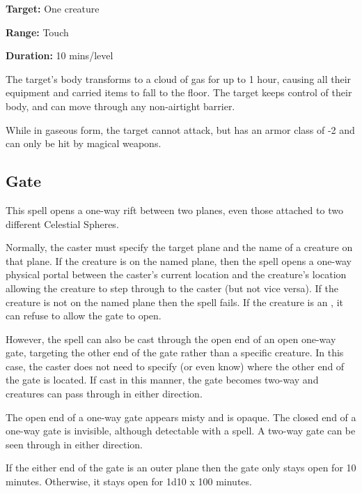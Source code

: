 \begin{multicols*}{2}
{\textbf{Target:} One creature

\textbf{Range:} Touch

\textbf{Duration:} 10 mins/level}

The target’s body transforms to a cloud of gas for up to 1 hour, causing all their equipment and carried items to fall to the floor. The target keeps control of their body, and can move through any non-airtight barrier.

While in gaseous form, the target cannot attack, but has an armor class of -2 and can only be hit by magical weapons.

\subsection{Gate}\label{spell:Gate}

This spell opens a one-way rift between two planes, even those attached to two different Celestial Spheres.

Normally, the caster must specify the target plane and the name of a creature on that plane. If the creature is on the named plane, then the spell opens a one-way physical portal between the caster’s current location and the creature’s location allowing the creature to step through to the caster (but not vice versa). If the creature is not on the named plane then the spell fails. If the creature is an , it can refuse to allow the gate to open.

However, the spell can also be cast through the open end of an open one-way gate, targeting the other end of the gate rather than a specific creature. In this case, the caster does not need to specify (or even know) where the other end of the gate is located. If cast in this manner, the gate becomes two-way and creatures can pass through in either direction.

The open end of a one-way gate appears misty and is opaque. The closed end of a one-way gate is invisible, although detectable with a  spell. A two-way gate can be seen through in either direction.

If the either end of the gate is an outer plane then the gate only stays open for 10 minutes. Otherwise, it stays open for 1d10 x 100 minutes.


\end{multicols*}
